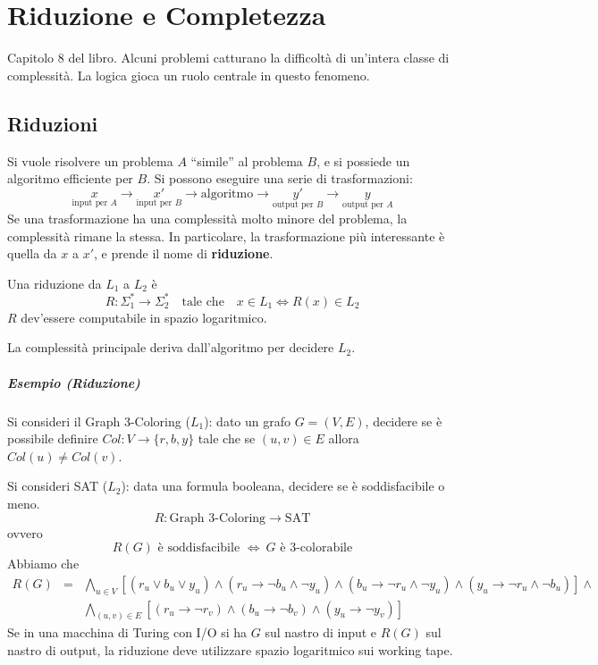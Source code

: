 \chapter{Riduzione e Completezza}
Capitolo 8 del libro. Alcuni problemi catturano la difficoltà di un'intera classe di complessità. La logica gioca un ruolo centrale in questo fenomeno.


\section{Riduzioni}
Si vuole risolvere un problema $A$ ``simile'' al problema $B$, e si possiede un algoritmo efficiente per $B$. Si possono eseguire una serie di trasformazioni:
$$
    \underset{\text{input per }A}{x} \to \underset{\text{input per }B}{x'} \to \text{algoritmo} \to \underset{\text{output per }B}{y'} \to \underset{\text{output per }A}{y}
$$
Se una trasformazione ha una complessità molto minore del problema, la complessità rimane la stessa. In particolare, la trasformazione più interessante è quella da $x$ a $x'$, e prende il nome di \textbf{riduzione}.
\begin{definition}[Riduzione]
    Una riduzione da $L_1$ a $L_2$ è
    $$
        R:\Sigma_1^*\to\Sigma_2^* \text{ ~ tale che ~ } x\in L_1 \Leftrightarrow R(x)\in L_2
    $$
    $R$ dev'essere computabile in spazio logaritmico.
\end{definition}
La complessità principale deriva dall'algoritmo per decidere $L_2$.

\paragraph{Esempio (Riduzione)} Si consideri il Graph 3-Coloring ($L_1$): dato un grafo $G=(V,E)$, decidere se è possibile definire $Col:V\to\{r,b,y\}$ tale che se $(u,v)\in E$ allora $Col(u)\neq Col(v)$.

Si consideri SAT ($L_2$): data una formula booleana, decidere se è soddisfacibile o meno. 
$$
    R:\text{Graph 3-Coloring}\to\text{SAT}
$$
ovvero
$$
    R(G) \text{ è soddisfacibile } \Leftrightarrow~ G \text{ è 3-colorabile}
$$
Abbiamo che 
\begin{eqnarray*}
    R(G) &=& \bigwedge_{u\in V} [(r_u\lor b_u\lor y_u) \land 
    (r_u\to \lnot b_u\land \lnot y_u) \land
    (b_u\to \lnot r_u\land \lnot y_u) \land
    (y_u\to \lnot r_u\land \lnot b_u)] \land\\
    & & \bigwedge_{(u,v)\in E} [(r_u\to \lnot r_v) \land (b_u\to \lnot b_v) \land (y_u\to \lnot y_v)]
\end{eqnarray*}
Se in una macchina di Turing con I/O si ha $G$ sul nastro di input e $R(G)$ sul nastro di output, la riduzione deve utilizzare spazio logaritmico sui working tape.

